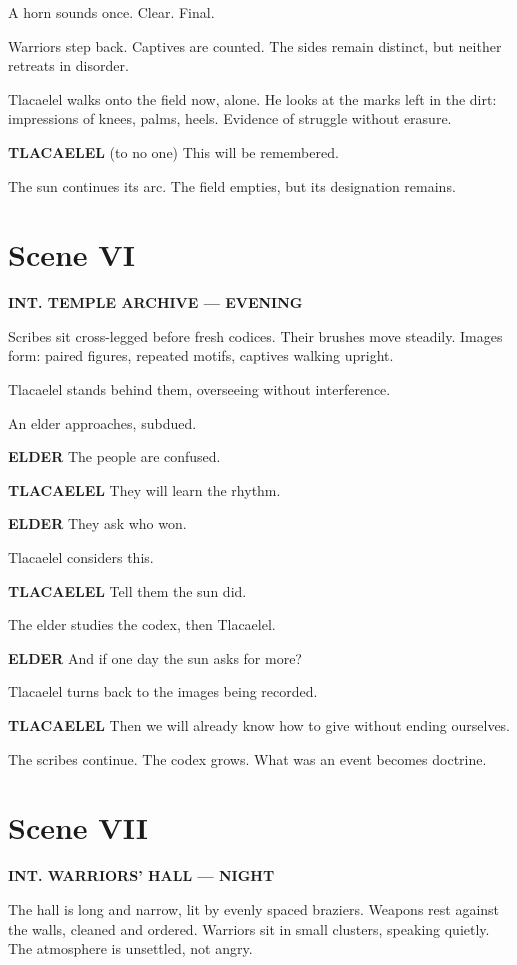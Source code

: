 \documentclass[12pt]{article}
\begin{document}
A horn sounds once. Clear. Final.

Warriors step back. Captives are counted. The sides remain distinct, but neither retreats in disorder.

Tlacaelel walks onto the field now, alone. He looks at the marks left in the dirt: impressions of knees, palms, heels. Evidence of struggle without erasure.

\textbf{TLACAELEL}  
(to no one)  
This will be remembered.

The sun continues its arc. The field empties, but its designation remains.

\section*{Scene VI}

\textbf{INT. TEMPLE ARCHIVE --- EVENING}

Scribes sit cross-legged before fresh codices. Their brushes move steadily. Images form: paired figures, repeated motifs, captives walking upright.

Tlacaelel stands behind them, overseeing without interference.

An elder approaches, subdued.

\textbf{ELDER}  
The people are confused.

\textbf{TLACAELEL}  
They will learn the rhythm.

\textbf{ELDER}  
They ask who won.

Tlacaelel considers this.

\textbf{TLACAELEL}  
Tell them the sun did.

The elder studies the codex, then Tlacaelel.

\textbf{ELDER}  
And if one day the sun asks for more?

Tlacaelel turns back to the images being recorded.

\textbf{TLACAELEL}  
Then we will already know how to give without ending ourselves.

The scribes continue. The codex grows. What was an event becomes doctrine.

\section*{Scene VII}

\textbf{INT. WARRIORS’ HALL --- NIGHT}

The hall is long and narrow, lit by evenly spaced braziers. Weapons rest against the walls, cleaned and ordered. Warriors sit in small clusters, speaking quietly. The atmosphere is unsettled, not angry.
\end{document}
